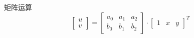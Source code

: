 \documentclass[12pt,a4paper]{article}
\begin{document}
矩阵运算
\begin{equation}
	\begin{bmatrix}
		u \\
		v
	\end{bmatrix}
	= 
	\begin{bmatrix}
		a_{0} & a_{1} & a_{2} \\
		b_{0} & b_{1} & b_{2}
	\end{bmatrix}
	\cdot
	\begin{bmatrix}
		1 & x & y
	\end{bmatrix}
	^{T}
\end{equation}
\end{document}
